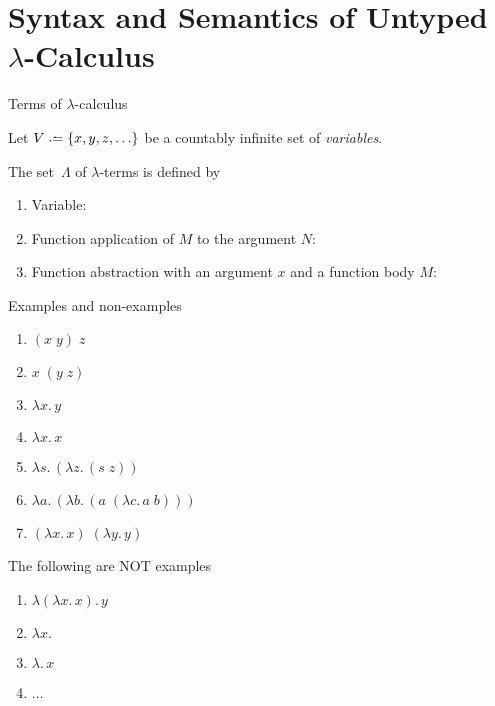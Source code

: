\section{Syntax and Semantics of Untyped $\lambda$-Calculus}

\begin{frame}{Terms of $\lambda$-calculus}

Let $V \defeq \{ x, y, z, \ldots \}$ be a countably infinite set of
\emph{variables}.
\begin{definition}
   The set~$\Lambda$ of \alert{$\lambda$-terms} is defined
  by
  \begin{enumerate}
    \item Variable:
      \begin{prooftree}
      \end{prooftree}

    \item Function application of $M$ to the argument $N$:
      \begin{prooftree}
      \end{prooftree}

    \item Function abstraction with an argument $x$ and a function body $M$:
      \begin{prooftree}
      \end{prooftree}
  \end{enumerate}
\end{definition}
\end{frame}

\begin{frame}{Examples and non-examples}
  \begin{enumerate}
    \item $(x\;y)\;z$
    \item $x\;(y\; z)$
    \item $\lambda x.\, y$
    \item $\lambda x.\, x$
    \item $\lambda s.\,(\lambda z.\, (s \;z))$
    \item $\lambda a.\,(\lambda b.\, (a\;(\lambda c.\, a\; b)))$
    \item $(\lambda x.\, x)\;(\lambda y.\, y)$
  \end{enumerate}
  The following are NOT examples
  \begin{enumerate}
    \item $\lambda (\lambda x.\, x).\, y$
    \item $\lambda x. $
    \item $\lambda.\, x$
    \item $\dots$
  \end{enumerate}
\end{frame}

